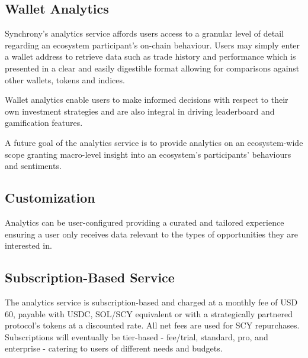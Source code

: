 \documentclass[10pt]{article}
\begin{document}
					\subsection{Wallet Analytics}
					Synchrony's analytics service affords users access to a granular level of detail
					regarding an ecosystem participant's on-chain behaviour. Users may simply enter
					a wallet address to retrieve data such as trade history and performance which is
					presented in a clear and easily digestible format allowing for comparisons
					against other wallets, tokens and indices. 

					Wallet analytics enable users to make
					informed decisions with respect to their own investment strategies and are also
					integral in driving leaderboard and gamification features.

					A future goal of the analytics service is to provide analytics on an
					ecosystem-wide scope granting macro-level insight into an ecosystem's
					participants' behaviours and sentiments.

					\subsection{Customization}
					Analytics can be user-configured providing a curated and tailored experience
					ensuring a user only receives data relevant to the types of opportunities they
					are interested in. 

					\subsection{Subscription-Based Service}
					The analytics service is subscription-based and charged at a monthly fee of USD
					60, payable with USDC, SOL/SCY equivalent or with a strategically partnered
					protocol's tokens at a discounted rate. All net fees are used for SCY
					repurchases. Subscriptions will eventually be tier-based - fee/trial, standard,
					pro, and enterprise - catering to users of different needs and budgets.
\end{document}
